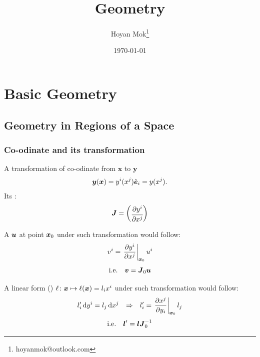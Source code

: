 \documentclass[openany]{book}
\title{Geometry}
\author{Hoyan Mok\thanks{hoyanmok@outlook.com}}
\date{\today} %
\begin{document}
\frontmatter
\tableofcontents

\mainmatter{}
\part{Basic Geometry}
\chapter{Geometry in Regions of a Space}
\section{Co-odinate and its transformation}
\begin{definition}[Jacobian]
A transformation of co-odinate from $\boldsymbol{x}$ to $\boldsymbol{y}$
\begin{align*}
	\boldsymbol{y}(\boldsymbol{x} ) = y^i(x^j)\hat{\boldsymbol{e}}_i=y(x^j).
\end{align*}
Its :
\begin{align}\label{Jacobian of transformation}
	\boldsymbol{J} = 
	\begin{pmatrix}
		\cfrac{\partial y^i}{\partial x^j}
	\end{pmatrix}
\end{align}
\end{definition}
A  $\boldsymbol{u}$ at point $\boldsymbol{x}_0$ under such transformation would follow:
\begin{align}\label{vector}
	v^i = \left.
			\frac{\partial y^i}{\partial x^j}
		\right|_{\boldsymbol{x}_0} u^i
\end{align}
\begin{align*}
	\text{i.e.}&&
	\boldsymbol{v} = \boldsymbol{J}_0\boldsymbol{u}
\end{align*}

A linear form () $\ell \colon \boldsymbol{x} \mapsto \ell(\boldsymbol{x}) = l_i x^i $ under such transformation would follow:
\begin{align}\label{linear form}
	l_i' \mathop{}\!\mathrm{d} y^i = l_j \mathop{}\!\mathrm{d} x^j 
	&&\Rightarrow&&
	l'_i = \left.
			\frac{\partial x^j}{\partial y_i}
		\right|_{\boldsymbol{x}_0} l_j
\end{align}
\begin{align*}
	\text{i.e.}&&
	\boldsymbol{l}' = \boldsymbol{l} \boldsymbol{J}^{-1}_0
\end{align*}
\end{document}
